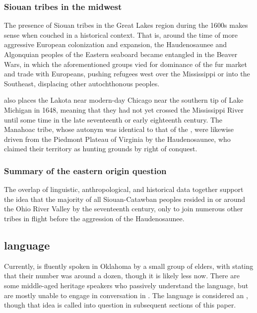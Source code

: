 \documentclass[output=paper]{LSP/langsci}
\begin{document}
\subsubsection{Siouan tribes in the midwest}

The presence of Siouan tribes in the Great Lakes region during the 1600s makes sense when couched in a historical context. That is, around the time of more aggressive European colonization and expansion, the Haudenosaunee and Algonquian peoples of the Eastern seaboard became entangled in the Beaver Wars, in which the aforementioned groups vied for dominance of the fur market and trade with Europeans, pushing refugees west over the Mississippi or into the Southeast, displacing other autochthonous peoples. 

\citet{Jennings1990} also places the Lakota near modern-day Chicago near the southern tip of Lake Michigan in 1648, meaning that they had not yet crossed the Mississippi River until some time in the late seventeenth or early eighteenth century. The Manahoac tribe, whose autonym was identical to that of the , were likewise driven from the Piedmont Plateau of Virginia by the Haudenosaunee, who claimed their territory as hunting grounds by right of conquest.

\subsubsection{Summary of the eastern origin question} 

The overlap of linguistic, anthropological, and historical data together support the idea that the majority of all Siouan-Catawban peoples resided in or around the Ohio River Valley by the seventeenth century, only to join numerous other tribes in flight before the aggression of the Haudenosaunee.

\subsection{ language}

Currently,  is fluently spoken in Oklahoma by a small group of elders, with \citet{Linn2000} stating that their number was around a dozen, though it is likely less now. There are some middle-aged heritage speakers who passively understand the language, but are mostly unable to engage in conversation in . The language is considered an , though that idea is called into question in subsequent sections of this paper.
\end{document}
